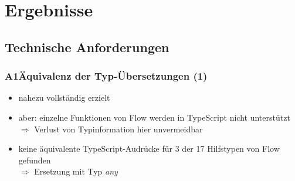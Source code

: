   \section{Ergebnisse}


    \subsection{Technische Anforderungen}

      \begin{frame}
        \frametitle{A1\hspace{0.75em}Äquivalenz der Typ-Übersetzungen (1)}
        \begin{itemize}
          \item nahezu vollständig erzielt
          \item aber: einzelne Funktionen von Flow werden in TypeScript nicht unterstützt\\
            \smallskip
            $\Rightarrow$ Verlust von Typinformation hier unvermeidbar
          \item keine äquivalente TypeScript-Audrücke für 3 der 17 Hilfstypen von Flow gefunden\\
            \smallskip
            $\Rightarrow$ Ersetzung mit Typ \textit{any}
        \end{itemize}
      \end{frame}

